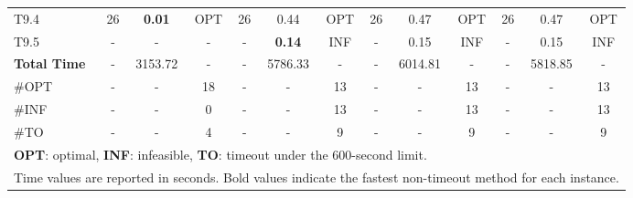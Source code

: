 \begin{table}[!htbp]
{\begin{tabular}{@{}l ccc ccc ccc ccc@{}}
T9.4 & 26 & \textbf{0.01} & OPT & 26 & 0.44 & OPT & 26 & 0.47 & OPT & 26 & 0.47 & OPT \\
T9.5 & - & - & - & - & \textbf{0.14} & INF & - & 0.15 & INF & - & 0.15 & INF \\
\midrule
\textbf{Total Time} & - & 3153.72 & - & - & 5786.33 & - & - & 6014.81 & - & - & 5818.85 & - \\
\#OPT & - & - & 18 & - & - & 13 & - & - & 13 & - & - & 13 \\
\#INF & - & - & 0 & - & - & 13 & - & - & 13 & - & - & 13 \\
\#TO & - & - & 4 & - & - & 9 & - & - & 9 & - & - & 9 \\
\bottomrule
\multicolumn{13}{l}{\footnotesize \textbf{OPT}: optimal, \textbf{INF}: infeasible, \textbf{TO}: timeout under the 600-second limit.} \\
\multicolumn{13}{l}{\footnotesize Time values are reported in seconds. Bold values indicate the fastest non-timeout method for each instance.}
\end{tabular}%
}
\end{table}
